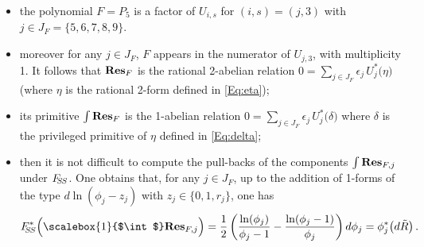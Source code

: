 \documentclass[11pt]{amsart}
\newcommand{\sk}{\smallskip}
\begin{document}
\begin{itemize}%
\item the polynomial $F=P_5$ is a factor of  $U_{i,s}$ for $(i,s)=(j,3)$ with 
$j\in J_F=\{5,6,7,8,9\}$. \sk
\item  moreover for any $j\in J_F$, $F$ appears in the numerator of $U_{j,3}$, with multiplicity 1. It follows that ${\bf Res}_{F}$ is the rational 2-abelian relation 
$0= 
\sum_{j \in J_F} \epsilon_j\,   U_j^*\big( \eta \big) 
$  (where $\eta$ is the rational 2-form defined in \eqref{Eq:eta}); 
\sk 
\item 
its primitive $\int {\bf Res}_{F}$ is the 1-abelian relation 
$0= 
\sum_{j \in J_F} \epsilon_j\,   U_j^*\big( \delta \big) 
$ where $\delta$ is the privileged primitive of $\eta$  defined in 
\eqref{Eq:delta}; 
\sk 
\item then it is not difficult to compute the pull-backs 
of the components 
$\int  \hspace{-0.0cm} {\bf Res}_{F,j}$ under 
$F_{\hspace{-0.03cm} 
\hspace{-0.04cm}
S\hspace{-0.03cm}S}$. One obtains that, 
for any $j\in J_F$, 
up to the addition of 1-forms of the type $d \ln( \phi_j-z_j)$ with $z_j\in \{0,1,r_j\}$, 
one has 
\begin{equation}
\label{Eq:FSS-Int-ResFj}
F_{\hspace{-0.05cm} 
\hspace{-0.04cm}
S\hspace{-0.03cm}S}^*\Big( 
\hspace{-0.0cm}
\scalebox{1}{$\int$}  \hspace{-0.0cm} {\bf Res}_{F,j}\Big)=
\frac{1}{2}\left(  \frac{\ln(\phi_j)}{\phi_j-1}- 
 \frac{\ln(\phi_j-1)}{\phi_j}
\right)d\phi_j = \phi_j^*\big( d\tilde R\big)\, .
\end{equation}%

\end{itemize}
\end{document}
